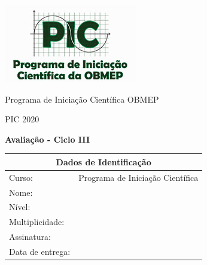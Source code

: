 \documentclass[oneside,a4paper,12pt]{article}
\theoremstyle{Colorido}
\theoremstyle{solu}
\theoremstyle{dotlessP}
\newcommand{\universidade}{Programa de Iniciação Científica OBMEP}
\newcommand{\centro}{PIC 2020}
\newcommand{\professor}{Douglas de Araujo Smigly}
\newcommand{\disciplina}{Programa de Iniciação Científica}
\newcommand{\entrega}{ }
\begin{document}
	\pagestyle{empty}
	
	\begin{center}
	\includegraphics[width=\linewidth/3]{logo_pic}%
	 	\vspace{0pt}
	 	
		\universidade
		\par
		\centro
		\par
		\par
		\par
		\vspace{24pt}
		\LARGE \textbf{Avalia\c c\~ao - Ciclo III}
		
	\end{center}
	
	\vspace{24pt}
	
%		
%	
	

	\begin{tabular}{ |l|p{12cm}| }
		
		\hline
		\multicolumn{2}{|c|}{\textbf{Dados de Identificação}} \\
			\hline
		Curso:        &  \disciplina \\
			\hline
		Nome:        &  \\
		\hline
		Nível:      &  \\
		\hline
				Multiplicidade:      &  \\
		\hline
				Assinatura:      &  \\
		\hline
				Data de entrega:      &  \entrega \\
		\hline
	\end{tabular}
	
\end{document}
